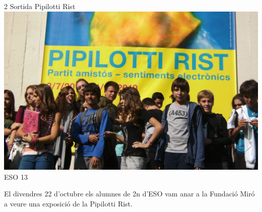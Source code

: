 \begin{news}
{2} %
{Sortida Pipilotti Rist}
{\noindent\includegraphics[width=16cm,keepaspectratio]{eso/img/pipilotib.JPG}}
{ESO}
{13} %

El divendres 22 d'octubre els alumnes de 2n d'ESO vam anar a la Fundació Miró a veure una exposició de la Pipilotti Rist.





\end{news}
